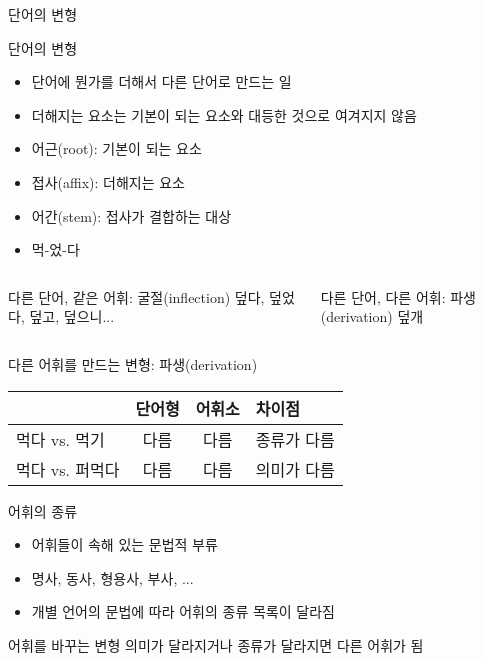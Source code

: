 \documentclass[11pt, aspectratio=169]{beamer}
\begin{document}
\begin{frame}[t]{단어의 변형}
  \begin{block}{단어의 변형}
    \begin{itemize}
      \item 단어에 뭔가를 더해서 다른 단어로 만드는 일
      \item 더해지는 요소는 기본이 되는 요소와 대등한 것으로 여겨지지 않음
      \item 어근(root): 기본이 되는 요소
      \item 접사(affix): 더해지는 요소
      \item 어간(stem): 접사가 결합하는 대상
    \end{itemize}
  \end{block}
  \begin{itemize}
    \item 먹-었-다
  \end{itemize}
  \begin{columns}
    \begin{column}[T]{0.46\textwidth}
      \begin{block}{다른 단어, 같은 어휘: 굴절(inflection)}
        덮다, 덮었다, 덮고, 덮으니... 
      \end{block}      
    \end{column}
    \begin{column}[T]{0.47\textwidth}
      \begin{block}{다른 단어, 다른 어휘: 파생(derivation)}
        덮개
      \end{block}      
    \end{column}
  \end{columns}
\end{frame}

\begin{frame}[t]{다른 어휘를 만드는 변형: 파생(derivation)}
  \begin{center}
    \begin{tabular}{lccl}
      \hline
      & \textbf{단어형} & \textbf{어휘소} & 차이점 \\
      \hline
      먹다 vs. 먹기 & 다름 & 다름 & 종류가 다름 \\
      먹다 vs. 퍼먹다 & 다름 & 다름 & 의미가 다름 \\      
      \hline
    \end{tabular}
  \end{center}
  \begin{block}{어휘의 종류}
    \begin{itemize}
      \item 어휘들이 속해 있는 문법적 부류
      \item 명사, 동사, 형용사, 부사, ... 
      \item 개별 언어의 문법에 따라 어휘의 종류 목록이 달라짐
    \end{itemize}
  \end{block}
  \begin{block}{어휘를 바꾸는 변형}
    의미가 달라지거나 종류가 달라지면 다른 어휘가 됨
  \end{block}
\end{frame}
\end{document}
